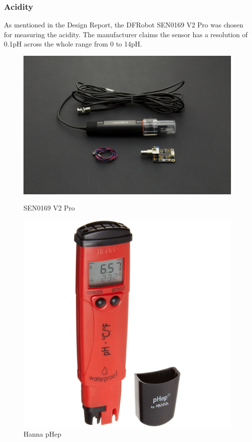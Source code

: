 \newpage
\subsubsection{Acidity} \label{sensors:acidity}

As mentioned in the Design Report, the DFRobot SEN0169 V2 Pro \cite{SEN0169V2} was chosen for measuring the acidity. The manufacturer claims the sensor has a resolution of 0.1pH across the whole range from 0 to 14pH.

\begin{figure}[h]
  \centering
  \begin{minipage}[b]{0.4\textwidth}
    \includegraphics[width=\textwidth]{080_testing/sensors/12_gravityv2pro.jpg}
    \caption{SEN0169 V2 Pro \cite{SEN0169V2}}
  \end{minipage}
  \hfill
  \begin{minipage}[b]{0.3\textwidth}
    \includegraphics[width=\textwidth]{080_testing/sensors/11_hanna.jpg}
    \caption{Hanna pHep \cite{hanna}}
  \end{minipage}
\end{figure}

